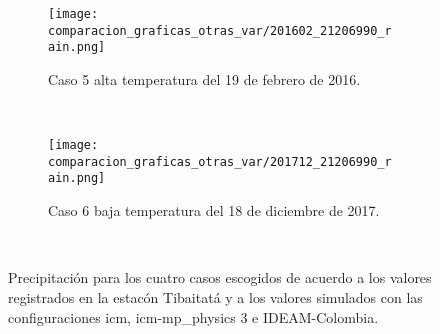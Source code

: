 \begin{figure}[H]
\centering    
\begin{subfigure}[normla]{0.4\textwidth}
\caption{Caso 5 alta temperatura del 19 de febrero de 2016.}
\label{caso5_tiba_wrf_prec}
\texttt{[image: comparacion\_graficas\_otras\_var/201602\_21206990\_rain.png]}
\end{subfigure}
~
\begin{subfigure}[normla]{0.4\textwidth}
\caption{Caso 6 baja temperatura del 18 de diciembre de 2017.}
\label{caso6_tiba_wrf_prec}
\texttt{[image: comparacion\_graficas\_otras\_var/201712\_21206990\_rain.png]}
\end{subfigure}
~


    \caption{
Precipitación para los cuatro casos escogidos de acuerdo a los valores registrados en la estacón Tibaitatá y a los valores simulados con las configuraciones icm, icm-mp\_physics 3 e IDEAM-Colombia.    
    }
    \label{fig:wrf_prec_tibaitata2}
\end{figure}


